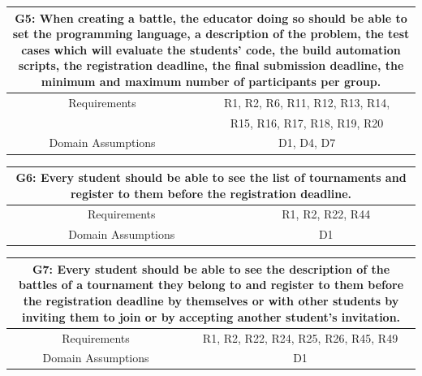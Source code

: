 \documentclass{article}
\begin{document}
\begin{table}[H]
    \centering
    \begin{tabular*}{\linewidth}{@{\extracolsep{\fill}} cc }
        \hline
        \multicolumn{2}{|c|}{\parbox{0.9\dimexpr\textwidth-2\tabcolsep\relax}{\centering\textbf{G5: When creating a battle, the educator doing so should be able to set the programming language, a description of the problem, the test cases which will evaluate the students' code, the build automation scripts, the registration deadline, the final submission deadline, the minimum and maximum number of participants per group.}}} \\
        \hline
        Requirements & R1, R2, R6, R11, R12, R13, R14,\\
                     & R15, R16, R17, R18, R19, R20\\
        \hline
        Domain Assumptions & D1, D4, D7\\
        \hline
    \end{tabular*}
\end{table}

\begin{table}[H]
    \centering
    \begin{tabular*}{\linewidth}{@{\extracolsep{\fill}} cc }
        \hline
        \multicolumn{2}{|c|}{\parbox{0.9\dimexpr\textwidth-2\tabcolsep\relax}{\centering\textbf{G6: Every student should be able to see the list of tournaments and register to them before the registration deadline.}}} \\
        \hline
        Requirements & R1, R2, R22, R44\\
        \hline
        Domain Assumptions & D1\\
        \hline
    \end{tabular*}
\end{table}

\begin{table}[H]
    \centering
    \begin{tabular*}{\linewidth}{@{\extracolsep{\fill}} cc }
        \hline
        \multicolumn{2}{|c|}{\parbox{0.9\dimexpr\textwidth-2\tabcolsep\relax}{\centering\textbf{G7: Every student should be able to see the description of the battles of a tournament they belong to and register to them before the registration deadline by themselves or with other students by inviting them to join or by accepting another student's invitation.}}} \\
        \hline
        Requirements & R1, R2, R22, R24, R25, R26, R45, R49\\
        \hline
        Domain Assumptions & D1\\
        \hline
    \end{tabular*}
\end{table}
\end{document}
